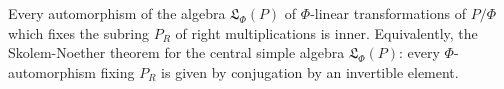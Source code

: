 Every automorphism of the algebra $\mathfrak{L}_\Phi(P)$ of $\Phi$-linear transformations of $P/\Phi$ which fixes the subring $P_R$ of right multiplications is inner. Equivalently, the Skolem-Noether theorem for the central simple algebra $\mathfrak{L}_\Phi(P)$: every $\Phi$-automorphism fixing $P_R$ is given by conjugation by an invertible element.
